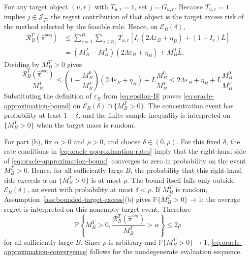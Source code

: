 \documentclass[a4paper, 12pt]{article}
\theoremstyle{plain}
\theoremstyle{remark}
\newcommand{\Prb}{\mathbb{P}}
\newcommand{\Ucal}{\mathcal{U}}
\newcommand{\1}{\mathbf{1}}
\begin{document}
For any target object \((u,r)\) with \(T_{u,r}=1\), set \(j=G_{u,r}\). Because \(T_{u,r}=1\) implies \(j\in\mathcal J_T\), the regret contribution of that object is the target excess risk of the method selected by the feasible rule. Hence, on \(\mathcal E_B(\delta)\),
\begin{equation*}
\begin{aligned}
    \mathcal R^T_B(\widehat\pi^{\mathrm{seq}})
    &\leq
    \sum_{r=1}^{B}\sum_{u\in\Ucal_r}
    T_{u,r}
    \left[
        I_r(2\Lambda\varepsilon_B+\eta_B)+(1-I_r)\bar L
    \right]
    \\
    &=
    (M^T_B-M^0_B)(2\Lambda\varepsilon_B+\eta_B)+M^0_B\bar L .
\end{aligned}
\end{equation*}
Dividing by \(M^T_B>0\) gives
\begin{equation*}
    \frac{\mathcal R^T_B(\widehat\pi^{\mathrm{seq}})}{M^T_B}
    \leq
    \left(1-\frac{M^0_B}{M^T_B}\right)(2\Lambda\varepsilon_B+\eta_B)
    +
    \bar L\frac{M^0_B}{M^T_B}
    \leq
    2\Lambda\varepsilon_B+\eta_B+\bar L\frac{M^0_B}{M^T_B} .
\end{equation*}
Substituting the definition of \(\varepsilon_B\) from \eqref{eq:epsilon-B} proves \eqref{eq:oracle-approximation-bound} on \(\mathcal E_B(\delta)\cap\{M^T_B>0\}\). The concentration event has probability at least \(1-\delta\), and the finite-sample inequality is interpreted on \(\{M^T_B>0\}\) when the target mass is random.

For part (b), fix \(\alpha>0\) and \(\rho>0\), and choose \(\delta\in(0,\rho)\). For this fixed \(\delta\), the rate conditions in \eqref{eq:oracle-approximation-rates} imply that the right-hand side of \eqref{eq:oracle-approximation-bound} converges to zero in probability on the event \(M^T_B>0\). Hence, for all sufficiently large \(B\), the probability that this right-hand side exceeds \(\alpha\) on \(\{M^T_B>0\}\) is at most \(\rho\). The bound itself fails only outside \(\mathcal E_B(\delta)\), an event with probability at most \(\delta<\rho\). If \(M^T_B\) is random, Assumption~\ref{ass:bounded-target-excess}(b) gives \(\Prb\{M^T_B>0\}\to1\); the average regret is interpreted on this nonempty-target event. Therefore
\begin{equation*}
    \Prb\!\left\{
        M^T_B>0,
        \frac{\mathcal R^T_B(\widehat\pi^{\mathrm{seq}})}{M^T_B}>\alpha
    \right\}
    \leq 2\rho
\end{equation*}
for all sufficiently large \(B\). Since \(\rho\) is arbitrary and \(\Prb\{M^T_B>0\}\to1\), \eqref{eq:oracle-approximation-convergence} follows for the nondegenerate evaluation sequence.
\end{document}
